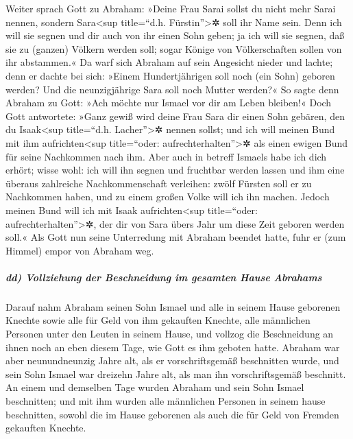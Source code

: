  Weiter sprach Gott zu Abraham: »Deine Frau Sarai sollst
du nicht mehr Sarai nennen, sondern Sara\textless sup title=``d.h.
Fürstin''\textgreater✲ soll ihr Name sein.  Denn ich will
sie segnen und dir auch von ihr einen Sohn geben; ja ich will sie
segnen, daß sie zu (ganzen) Völkern werden soll; sogar Könige von
Völkerschaften sollen von ihr abstammen.«  Da warf sich
Abraham auf sein Angesicht nieder und lachte; denn er dachte bei sich:
»Einem Hundertjährigen soll noch (ein Sohn) geboren werden? Und die
neunzigjährige Sara soll noch Mutter werden?«  So sagte
denn Abraham zu Gott: »Ach möchte nur Ismael vor dir am Leben bleiben!«
 Doch Gott antwortete: »Ganz gewiß wird deine Frau Sara
dir einen Sohn gebären, den du Isaak\textless sup title=``d.h.
Lacher''\textgreater✲ nennen sollst; und ich will meinen Bund mit ihm
aufrichten\textless sup title=``oder: aufrechterhalten''\textgreater✲
als einen ewigen Bund für seine Nachkommen nach ihm. 
Aber auch in betreff Ismaels habe ich dich erhört; wisse wohl: ich will
ihn segnen und fruchtbar werden lassen und ihm eine überaus zahlreiche
Nachkommenschaft verleihen: zwölf Fürsten soll er zu Nachkommen haben,
und zu einem großen Volke will ich ihn machen.  Jedoch
meinen Bund will ich mit Isaak aufrichten\textless sup title=``oder:
aufrechterhalten''\textgreater✲, der dir von Sara übers Jahr um diese
Zeit geboren werden soll.«  Als Gott nun seine
Unterredung mit Abraham beendet hatte, fuhr er (zum Himmel) empor von
Abraham weg.

\hypertarget{dd-vollziehung-der-beschneidung-im-gesamten-hause-abrahams}{%
\subparagraph{dd) Vollziehung der Beschneidung im gesamten Hause
Abrahams}\label{dd-vollziehung-der-beschneidung-im-gesamten-hause-abrahams}}

 Darauf nahm Abraham seinen Sohn Ismael und alle in
seinem Hause geborenen Knechte sowie alle für Geld von ihm gekauften
Knechte, alle männlichen Personen unter den Leuten in seinem Hause, und
vollzog die Beschneidung an ihnen noch an eben diesem Tage, wie Gott es
ihm geboten hatte.  Abraham war aber neunundneunzig Jahre
alt, als er vorschriftsgemäß beschnitten wurde,  und sein
Sohn Ismael war dreizehn Jahre alt, als man ihn vorschriftsgemäß
beschnitt.  An einem und demselben Tage wurden Abraham
und sein Sohn Ismael beschnitten;  und mit ihm wurden
alle männlichen Personen in seinem hause beschnitten, sowohl die im
Hause geborenen als auch die für Geld von Fremden gekauften Knechte.

